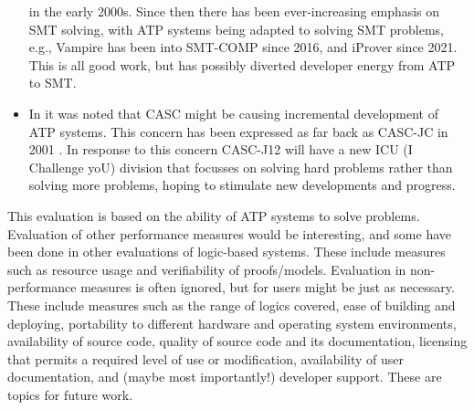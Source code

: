 \documentclass[runningheads]{llncs}
\begin{document}
\begin{itemize}
      in the early 2000s.
      Since then there has been ever-increasing emphasis on SMT solving, with ATP systems being 
      adapted to solving SMT problems, e.g., Vampire has been into SMT-COMP since 2016, and
      iProver since 2021.
      This is all good work, but has possibly diverted developer energy from ATP to SMT.
\item In \cite{SD24-CASC} it was noted that CASC might be causing incremental development of ATP
      systems.
      This concern has been expressed as far back as CASC-JC in 2001 \cite{PSS02}.
      In response to this concern CASC-J12 will have a new ICU (I Challenge yoU) division that
      focusses on solving hard problems rather than solving more problems, hoping to stimulate
      new developments and progress.
\end{itemize}

This evaluation is based on the ability of ATP systems to solve problems.
Evaluation of other performance measures would be interesting, and some have been done
in other evaluations of logic-based systems.
These include measures such as resource usage and verifiability of proofs/models.
Evaluation in non-performance measures is often ignored, but for users might be just as
necessary.
These include measures such as 
the range of logics covered, 
ease of building and deploying,
portability to different hardware and operating system environments, 
availability of source code, 
quality of source code and its documentation,
licensing that permits a required level of use or modification, 
availability of user documentation, 
and (maybe most importantly!)
developer support.
These are topics for future work.



\end{document}
